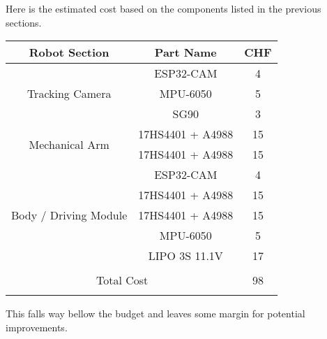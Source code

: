 \documentclass{article}
\begin{document}
Here is the estimated cost based on the components listed in the previous sections.

\begin{center}
\begin{tabular}{ ||c|c|c|| } 

\hline
Robot Section & Part Name & CHF \\
\hline
\hline
\multirow{3}{4em}{Tracking Camera} & ESP32-CAM & 4 \\ 
& MPU-6050 & 5 \\ 
& SG90 & 3 \\ 
\hline
\hline
\multirow{2}{4em}{Mechanical Arm} & 17HS4401 + A4988 & 15\\ 
& 17HS4401 + A4988 & 15 \\
\hline
\hline
\multirow{5}{4em}{Body / Driving Module} & ESP32-CAM & 4 \\ 
& 17HS4401 + A4988 & 15\\ 
& 17HS4401 + A4988 & 15\\ 
& MPU-6050 & 5 \\ 
& LIPO 3S 11.1V & 17 \\
\hline
\hline
\multicolumn{2}{||c|}{\multirow{3}{4em}{Total Cost}} & \\
\multicolumn{2}{||c|}{} & 98 \\
\multicolumn{2}{||c|}{} & \\
\hline
\end{tabular}
\end{center}

This falls way bellow the budget and leaves some margin for potential improvements.

\newpage
\printbibliography
\end{document}

